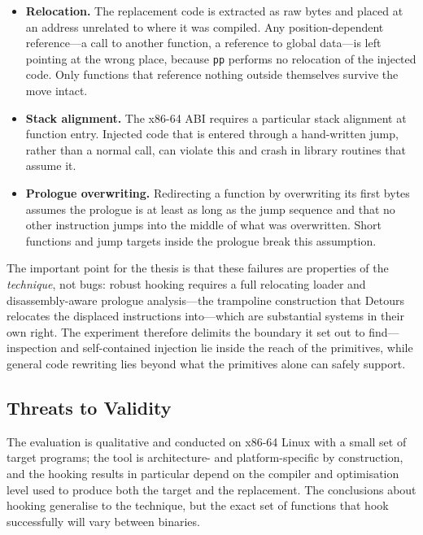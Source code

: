 \documentclass[10pt,twocolumn,a4paper]{article}
\begin{document}
\begin{itemize}
  \item \textbf{Relocation.} The replacement code is extracted as raw bytes and
  placed at an address unrelated to where it was compiled. Any
  position-dependent reference---a call to another function, a reference to global
  data---is left pointing at the wrong place, because \texttt{pp} performs no
  relocation of the injected code. Only functions that reference nothing outside
  themselves survive the move intact.
  \item \textbf{Stack alignment.} The x86-64 ABI requires a particular stack
  alignment at function entry. Injected code that is entered through a hand-written
  jump, rather than a normal call, can violate this and crash in library routines
  that assume it.
  \item \textbf{Prologue overwriting.} Redirecting a function by overwriting its
  first bytes assumes the prologue is at least as long as the jump sequence and
  that no other instruction jumps into the middle of what was overwritten. Short
  functions and jump targets inside the prologue break this assumption.
\end{itemize}

The important point for the thesis is that these failures are properties of the
\emph{technique}, not bugs: robust hooking requires a full relocating loader and
disassembly-aware prologue analysis---the trampoline construction that
Detours~\cite{detours} relocates the displaced instructions into---which are
substantial systems in their own right. The experiment therefore delimits the boundary it set out to
find---inspection and self-contained injection lie inside the reach of the
primitives, while general code rewriting lies beyond what the primitives alone can
safely support.

\subsection{Threats to Validity}
The evaluation is qualitative and conducted on x86-64 Linux with a small set of
target programs; the tool is architecture- and platform-specific by construction,
and the hooking results in particular depend on the compiler and optimisation level
used to produce both the target and the replacement. The conclusions about hooking
generalise to the technique, but the exact set of functions that hook successfully
will vary between binaries.

\end{document}
